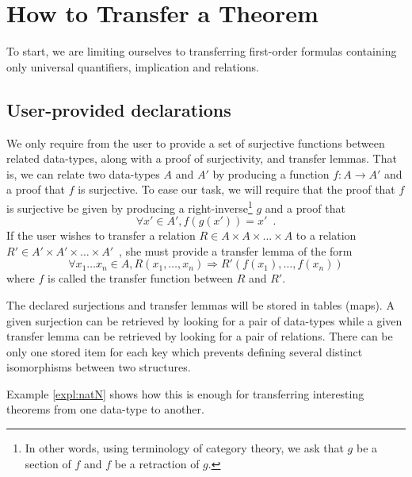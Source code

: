 \documentclass{llncs}
\begin{document}
\section{How to Transfer a Theorem}
\label{sec:transf}

To start, we are limiting ourselves to transferring first-order formulas containing only universal quantifiers,
implication and relations.

\subsection{User-provided declarations}

We only require from the user to provide a set of surjective functions between related data-types,
along with a proof of surjectivity, and transfer lemmas.
That is, we can relate two data-types $A$ and $A'$ by producing a function $f : A \rightarrow A'$
and a proof that $f$ is surjective.
To ease our task, we will require that the proof that $f$ is surjective be given by producing a
right-inverse\footnote{In other words, using
terminology of category theory, we ask
that $g$ be a section of $f$ and $f$ be a retraction of $g$.} $g$ and a proof that
\[
    \forall x' \in A', f( g(x') ) = x' \enspace .
\]
If the user wishes to transfer a relation $R \in A \times A \times \ldots \times A$ to a relation
$R' \in A' \times A' \times \ldots \times A' \enspace$, she must provide a transfer lemma of the
form
\[
    \forall x_1 \ldots x_n \in A, R(x_1, \ldots, x_n) \Rightarrow R'(f(x_1), \ldots, f(x_n))
\]
where $f$ is called the transfer function between $R$ and $R'$.

The declared surjections and transfer lemmas will be stored in tables (maps).
A given surjection can be retrieved by looking for a pair of data-types while a given transfer
lemma can be retrieved by looking for a pair of relations.
There can be only one stored item for each key which prevents defining several distinct isomorphisms
between two structures.

Example \ref{expl:natN} shows how this is enough for transferring interesting theorems from one
data-type to another.
\end{document}
